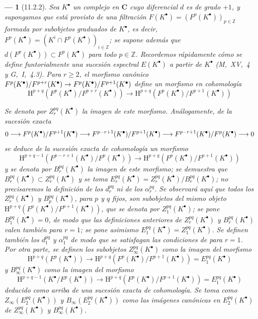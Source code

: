 \documentclass[10pt,oneside,openany]{book}
\theoremstyle{egaenv}\newtheorem*{env}{---}
\theoremstyle{egastatement}
\theoremstyle{egadescription}
\newcommand{\oldpage}[2][]{\marginnote{\normalfont\scriptsize\textbf{#1}\,|\,#2}\ignorespaces}
\renewcommand{\geq}{\geqslant}
\renewcommand{\to}{\mathchoice{\longrightarrow}{\rightarrow}{\rightarrow}{\rightarrow}}
\begin{document}
\begin{env}[11.2.2]
\label{0.11.2.2}
\label{0.11.2.2-fr}
Sea $K^\bullet$ un complejo en $\boldsymbol{C}$ cuyo diferencial $d$ es de grado $+1$, y supongamos que está provisto de una \emph{filtración $F(K^\bullet)=(F^p(K^\bullet))_{p\in\mathbb Z}$} formada por subobjetos \emph{graduados}
\oldpage[0\textsubscript{III}]{28}
de $K^\bullet$, es decir, $F^p(K^\bullet)=(K^i\cap F^p(K^\bullet))_{i\in\mathbb Z}$; se supone además que $d(F^p(K^\bullet))\subset F^p(K^\bullet)$ para todo $p\in\mathbb Z$.
Recordemos rápidamente cómo se define \emph{funtorialmente} una sucesión espectral $E(K^\bullet)$ a partir de $K^\bullet$ (M,~XV,~4 y G,~I,~4.3).
Para $r\geq2$, el morfismo canónico $F^p(K^\bullet)/F^{p+r}(K^\bullet)\to
F^p(K^\bullet)/F^{p+1}(K^\bullet)$ define un morfismo en cohomología
\[
  \mathrm H^{p+q}(F^p(K^\bullet)/F^{p+r}(K^\bullet))
  \longrightarrow
  \mathrm H^{p+q}(F^p(K^\bullet)/F^{p+1}(K^\bullet))
\]

Se denota por $Z_r^{pq}(K^\bullet)$ la imagen de este morfismo.
Análogamente, de la sucesión exacta
\[
  0\to F^p(K^\bullet)/F^{p+1}(K^\bullet)
  \to F^{p-r+1}(K^\bullet)/F^{p+1}(K^\bullet)
  \to F^{p-r+1}(K^\bullet)/F^p(K^\bullet)\to0
\]
se deduce de la sucesión exacta de cohomología un morfismo
\[
  \mathrm H^{p+q-1}(F^{p-r+1}(K^\bullet)/F^p(K^\bullet))
  \longrightarrow
  \mathrm H^{p+q}(F^p(K^\bullet)/F^{p+1}(K^\bullet))
\]
y se denota por $B_r^{pq}(K^\bullet)$ la imagen de este morfismo; se demuestra que $B_r^{pq}(K^\bullet)\subset Z_r^{pq}(K^\bullet)$ y se toma $E_r^{pq}(K^\bullet)=Z_r^{pq}(K^\bullet)/B_r^{pq}(K^\bullet)$; no precisaremos la definición de los $d_r^{pq}$ ni de los $\alpha_r^{pq}$. Se observará aquí que todos los $Z_r^{pq}(K^\bullet)$ y $B_p^{pq}(K^\bullet)$, para $p$ y $q$ fijos, son subobjetos del mismo objeto $\mathrm H^{p+q}(F^p(K^\bullet)/F^{p+1}(K^\bullet))$, que se denota por $Z_1^{pq}(K^\bullet)$; se pone $B_1^{pq}(K^\bullet)=0$, de modo que las definiciones anteriores de $Z_r^{pq}(K^\bullet)$ y $B_r^{pq}(K^\bullet)$ valen también para $r=1$; se pone asimismo $E_1^{pq}(K^\bullet)=Z_1^{pq}(K^\bullet)$. Se definen también los $d_1^{pq}$ y $\alpha_1^{pq}$ de modo que se satisfagan las condiciones de  para $r=1$.
Por otra parte, se definen los subobjetos $Z_\infty^{pq}(K^\bullet)$ como la imagen del morfismo
\[
  \mathrm H^{p+q}(F^p(K^\bullet))\longrightarrow
  \mathrm H^{p+q}(F^p(K^\bullet)/F^{p+1}(K^\bullet))
  =E_1^{pq}(K^\bullet)
\]
y $B_\infty^{pq}(K^\bullet)$ como la imagen del morfismo
\[
  \mathrm H^{p+q-1}(K^\bullet/F^p(K^\bullet))\longrightarrow
  \mathrm H^{p+q}(F^p(K^\bullet)/F^{p+1}(K^\bullet))
  =E_1^{pq}(K^\bullet)
\] deducido como arriba de una sucesión exacta de cohomología. Se toma como $Z_\infty(E_2^{pq}(K^\bullet))$ y $B_\infty(E_2^{pq}(K^\bullet))$ como las imágenes canónicas en $E_2^{pq}(K^\bullet)$ de $Z_\infty^{pq}(K^\bullet)$ y $B_\infty^{pq}(K^\bullet)$.


\end{env}
\end{document}
